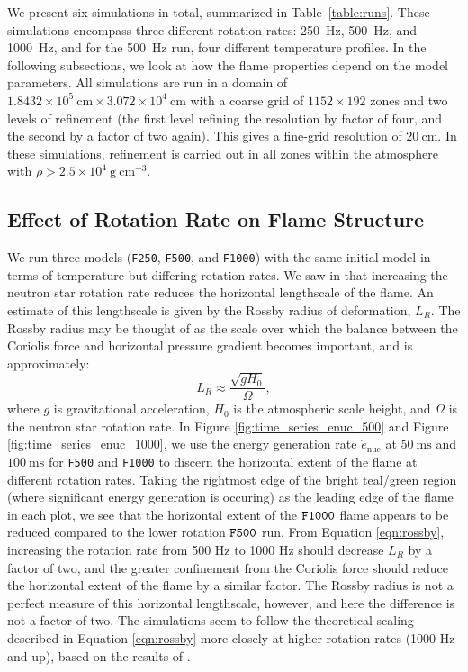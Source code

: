 \documentclass[preprint,times,tighten]{aastex63}
\newcommand{\gcc}{\mathrm{g~cm^{-3} }}
\begin{document}
We present six simulations in total, summarized in
Table~\ref{table:runs}.  These simulations encompass three different
rotation rates: 250~Hz, 500~Hz, and 1000~Hz, and for the 500~Hz run, four
different temperature profiles.  In the following subsections, we look
at how the flame properties depend on the model parameters.  All
simulations are run in a domain of $1.8432\times 10^5~\mathrm{cm} \times
3.072\times 10^4~\mathrm{cm}$ with a coarse grid of $1152 \times 192$
zones and two levels of refinement (the first level refining the resolution 
by factor of four, and the second by a factor of two again).  This gives a
fine-grid resolution of $20~\mathrm{cm}$.  In these simulations, refinement 
is carried out in all zones within the atmosphere
with $\rho > 2.5\times 10^4~\gcc$.

\subsection{Effect of Rotation Rate on Flame Structure}\label{ssec:rot_structure}

We run three models ({\tt F250}, {\tt F500}, and {\tt F1000}) with the same initial model in terms 
of temperature but differing rotation rates. {\color{blue}We saw in \citet{flame_wave1} that 
increasing the 
neutron star rotation rate reduces the horizontal lengthscale of the flame. An estimate of 
this lengthscale is given by the Rossby radius of deformation, $L_R$. The Rossby radius may be 
thought of as the scale over which the balance between the Coriolis force and horizontal pressure 
gradient becomes important, and is approximately:
\begin{equation}
	\label{eqn:rossby}
	L_R \approx \frac{\sqrt{g H_0}}{\Omega},
\end{equation}
where $g$ is gravitational acceleration, $H_0$ is the atmospheric scale height, and $\Omega$ is the 
neutron star rotation rate. In Figure \ref{fig:time_series_enuc_500} and Figure 
\ref{fig:time_series_enuc_1000}, we use the energy generation rate $\dot{e}_\mathrm{nuc}$ at $50~\mathrm{ms}$ and $100~\mathrm{ms}$ for {\tt F500} and {\tt F1000} to discern the horizontal extent of the flame at different rotation rates. Taking the rightmost edge of the bright teal/green region (where significant energy generation is occuring) as the leading edge of the flame in each plot, we see that the horizontal extent of the $\tt{F1000}$ flame appears to be 
reduced compared to the lower rotation $\tt{F500}$ run. From Equation \ref{eqn:rossby}, increasing 
the rotation rate from 500 Hz to 1000 Hz should decrease $L_R$ by a factor of two, and the greater 
confinement from the Coriolis force should reduce the horizontal extent of the flame by a similar 
factor. The Rossby radius is not a perfect measure of this horizontal lengthscale, however, and 
here the difference is not a factor of two. The simulations seem to follow the theoretical
scaling described in Equation \ref{eqn:rossby} more closely at higher rotation rates (1000 Hz and 
up), based on the results of \citet{flame_wave1}.}
\end{document}

